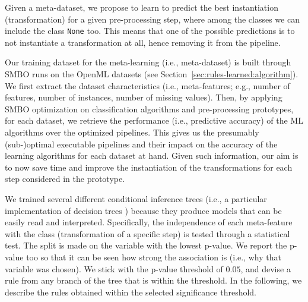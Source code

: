 Given a meta-dataset, we propose to learn to predict the best instantiation (transformation) for a given pre-processing step, where among the classes we can include the class \texttt{None} too.
This means that one of the possible predictions is to not instantiate a transformation at all, hence removing it from the pipeline.

\begin{example}
Our training dataset for the meta-learning (i.e., meta-dataset) is built through SMBO runs on the OpenML datasets (see Section~\ref{sec:rules-learned:algorithm}).
We first extract the dataset characteristics (i.e., meta-features; e.g., number of features, number of instances, number of missing values).
Then, by applying SMBO optimization on classification algorithms and pre-processing prototypes, for each dataset, we retrieve the performance (i.e., predictive accuracy) of the ML algorithms over the optimized pipelines.
This gives us the presumably (sub-)optimal executable pipelines and their impact on the accuracy of the learning algorithms for each dataset at hand.
Given such information, our aim is to now save time and improve the instantiation of the transformations for each step considered in the prototype.

We trained several different conditional inference trees (i.e., a particular implementation of decision trees \cite{ctree}) because they produce models that can be easily read and interpreted.
Specifically, the independence of each meta-feature with the class (transformation of a specific step) is tested through a statistical test.
The split is made on the variable with the lowest p-value.
We report the p-value too so that it can be seen how strong the association is (i.e., why that variable was chosen).
We stick with the p-value threshold of $0.05$, and devise a rule from any branch of the tree that is within the threshold.
In the following, we describe the rules obtained within the selected significance threshold.


\end{example}
